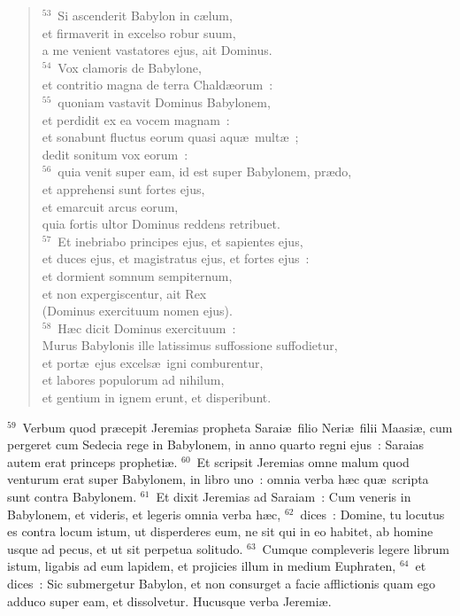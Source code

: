 \begin{flushleft}
\begin{verse}
${}^{53}$~Si ascenderit Babylon in c\ae lum,\\ et firmaverit in excelso robur suum,\\ a me venient vastatores ejus, ait Dominus.\\
${}^{54}$~Vox clamoris de Babylone,\\ et contritio magna de terra Chald\ae orum~:\\
${}^{55}$~quoniam vastavit Dominus Babylonem,\\ et perdidit ex ea vocem magnam~:\\ et sonabunt fluctus eorum quasi aqu\ae\ mult\ae~;\\ dedit sonitum vox eorum~:\\
${}^{56}$~quia venit super eam, id est super Babylonem, pr\ae do,\\ et apprehensi sunt fortes ejus,\\ et emarcuit arcus eorum,\\ quia fortis ultor Dominus reddens retribuet.\\
${}^{57}$~Et inebriabo principes ejus, et sapientes ejus,\\ et duces ejus, et magistratus ejus, et fortes ejus~:\\ et dormient somnum sempiternum,\\ et non expergiscentur, ait Rex\\ (Dominus exercituum nomen ejus).\\
${}^{58}$~H\ae c dicit Dominus exercituum~:\\ Murus Babylonis ille latissimus suffossione suffodietur,\\ et port\ae\ ejus excels\ae\ igni comburentur,\\ et labores populorum ad nihilum,\\ et gentium in ignem erunt, et disperibunt.\end{verse}\end{flushleft}


${}^{59}$~Verbum quod pr\ae cepit Jeremias propheta Sarai\ae\ filio Neri\ae\ filii Maasi\ae , cum pergeret cum Sedecia rege in Babylonem, in anno quarto regni ejus~: Saraias autem erat princeps propheti\ae .
${}^{60}$~Et scripsit Jeremias omne malum quod venturum erat super Babylonem, in libro uno~: omnia verba h\ae c qu\ae\ scripta sunt contra Babylonem.
${}^{61}$~Et dixit Jeremias ad Saraiam~: Cum veneris in Babylonem, et videris, et legeris omnia verba h\ae c,
${}^{62}$~dices~: Domine, tu locutus es contra locum istum, ut disperderes eum, ne sit qui in eo habitet, ab homine usque ad pecus, et ut sit perpetua solitudo.
${}^{63}$~Cumque compleveris legere librum istum, ligabis ad eum lapidem, et projicies illum in medium Euphraten,
${}^{64}$~et dices~: Sic submergetur Babylon, et non consurget a facie afflictionis quam ego adduco super eam, et dissolvetur. Hucusque verba Jeremi\ae .

